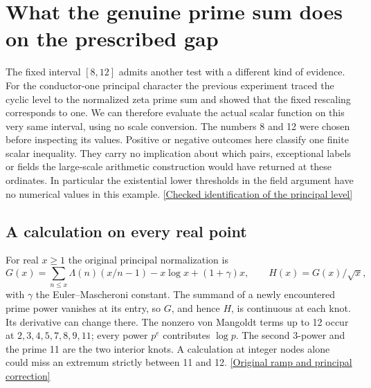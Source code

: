 \documentclass[12pt,letterpaper]{article}
\begin{document}
\section{What the genuine prime sum does on the prescribed gap}
\label{sec:gap-principal}
The fixed interval \([8,12]\) admits another test with a different kind of evidence. For the conductor-one principal character the previous experiment traced the cyclic level to the normalized zeta prime sum and showed that the fixed rescaling corresponds to one. We can therefore evaluate the actual scalar function on this very same interval, using no scale conversion. The numbers 8 and 12 were chosen before inspecting its values. Positive or negative outcomes here classify one finite scalar inequality. They carry no implication about which pairs, exceptional labels or fields the large-scale arithmetic construction would have returned at these ordinates. In particular the existential lower thresholds in the field argument have no numerical values in this example. \href{https://github.com/nousentllc/riemann-hypothesis/blob/d79bd956c6fb2b8a3de51b606765be81d24fb1fc/research/uriel/experiments/cofinal-endpoint-certificates/evidence/transport/extension/UnitCases.lean}{[Checked identification of the principal level]}

\subsection{A calculation on every real point}
For real \(x\ge1\) the original principal normalization is
\[
 G(x)=\sum_{n\le x}\Lambda(n)(x/n-1)-x\log x+(1+\gamma)x,
 \qquad H(x)=G(x)/\sqrt{x},
\]
with \(\gamma\) the Euler--Mascheroni constant. The summand of a newly encountered prime power vanishes at its entry, so \(G\), and hence \(H\), is continuous at each knot. Its derivative can change there. The nonzero von Mangoldt terms up to 12 occur at \(2,3,4,5,7,8,9,11\); every power \(p^e\) contributes \(\log p\). The second \(3\)-power and the prime 11 are the two interior knots. A calculation at integer nodes alone could miss an extremum strictly between 11 and 12. \href{https://github.com/nousentllc/riemann-hypothesis/blob/40e56bab026552e089d7afcfeff08d2defb9c005/src/Development/AutomorphicArithmetic/DedekindLFunctions/CharFamily.lean#L10-L23}{[Original ramp and principal correction]}
\end{document}
